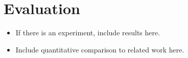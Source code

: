 \section{Evaluation}\label{sec:eval}

\begin{itemize}
  \item If there is an experiment, include results here.
  \item Include quantitative comparison to related work here.
\end{itemize}
